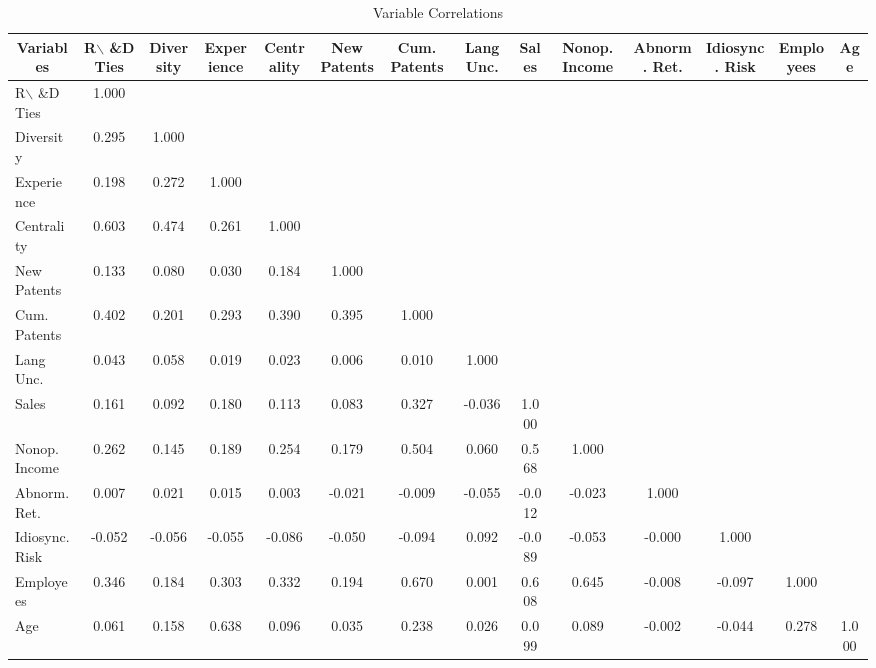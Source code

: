 \begin{table}[htbp]\centering \caption{Variable Correlations\label{corrtable}}
\begin{tabular}{l  c  c  c  c  c  c  c  c  c  c  c  c  c }\hline\hline
\multicolumn{1}{c}{Variables} &R$\backslash$ \&D Ties&Diversity&Experience&Centrality&New Patents&Cum. Patents&Lang Unc.&Sales&Nonop. Income&Abnorm. Ret.&Idiosync. Risk&Employees&Age\\ \hline
R$\backslash$ \&D Ties&1.000\\
Diversity&0.295&1.000\\
Experience&0.198&0.272&1.000\\
Centrality&0.603&0.474&0.261&1.000\\
New Patents&0.133&0.080&0.030&0.184&1.000\\
Cum. Patents&0.402&0.201&0.293&0.390&0.395&1.000\\
Lang Unc.&0.043&0.058&0.019&0.023&0.006&0.010&1.000\\
Sales&0.161&0.092&0.180&0.113&0.083&0.327&-0.036&1.000\\
Nonop. Income&0.262&0.145&0.189&0.254&0.179&0.504&0.060&0.568&1.000\\
Abnorm. Ret.&0.007&0.021&0.015&0.003&-0.021&-0.009&-0.055&-0.012&-0.023&1.000\\
Idiosync. Risk&-0.052&-0.056&-0.055&-0.086&-0.050&-0.094&0.092&-0.089&-0.053&-0.000&1.000\\
Employees&0.346&0.184&0.303&0.332&0.194&0.670&0.001&0.608&0.645&-0.008&-0.097&1.000\\
Age&0.061&0.158&0.638&0.096&0.035&0.238&0.026&0.099&0.089&-0.002&-0.044&0.278&1.000\\
\hline \hline 
 \end{tabular}
\end{table}
